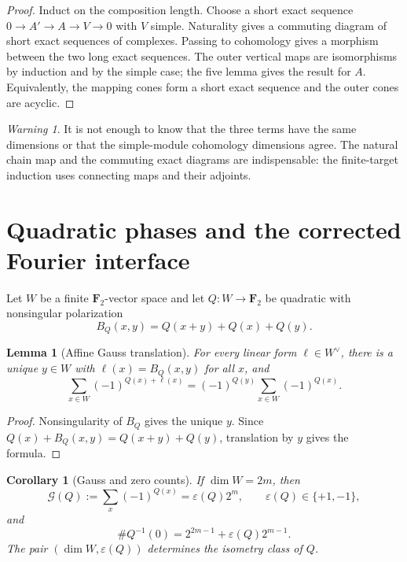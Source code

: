 \documentclass[11pt,reqno]{amsart}
\newtheorem{lemma}[theorem]{Lemma}
\newtheorem{corollary}[theorem]{Corollary}
\theoremstyle{remark}
\newtheorem{warning}[theorem]{Warning}
\numberwithin{equation}{section}
\newcommand{\F}{\mathbf F}
\newcommand{\Gsum}{\mathcal G}
\newcommand{\eps}{\varepsilon}
\begin{document}
\begin{proof}
Induct on the composition length.  Choose a short exact sequence
\(0\to A'\to A\to V\to0\) with \(V\) simple.  Naturality gives a
commuting diagram of short exact sequences of complexes.  Passing to
cohomology gives a morphism between the two long exact sequences.  The
outer vertical maps are isomorphisms by induction and by the simple case;
the five lemma gives the result for \(A\).  Equivalently, the mapping
cones form a short exact sequence and the outer cones are acyclic.
\end{proof}

\begin{warning}
It is not enough to know that the three terms have the same dimensions or
that the simple-module cohomology dimensions agree.  The natural chain map
and the commuting exact diagrams are indispensable: the finite-target
induction uses connecting maps and their adjoints.
\end{warning}

\section{Quadratic phases and the corrected Fourier interface}
\label{sec:fourier}

Let \(W\) be a finite \(\F_2\)-vector space and let
\(Q:W\to\F_2\) be quadratic with nonsingular polarization
\[
 B_Q(x,y)=Q(x+y)+Q(x)+Q(y).
\]

\begin{lemma}[Affine Gauss translation]\label{lem:gauss-translate}
For every linear form \(\ell\in W^\vee\), there is a unique
\(y\in W\) with \(\ell(x)=B_Q(x,y)\) for all \(x\), and
\[
 \sum_{x\in W}(-1)^{Q(x)+\ell(x)}
 =(-1)^{Q(y)}\sum_{x\in W}(-1)^{Q(x)}.
\]
\end{lemma}

\begin{proof}
Nonsingularity of \(B_Q\) gives the unique \(y\).  Since
\(Q(x)+B_Q(x,y)=Q(x+y)+Q(y)\), translation by \(y\) gives the formula.
\end{proof}

\begin{corollary}[Gauss and zero counts]\label{cor:gauss-count}
If \(\dim W=2m\), then
\[
 \Gsum(Q):=\sum_x(-1)^{Q(x)}=\eps(Q)2^m,
 \qquad \eps(Q)\in\{+1,-1\},
\]
and
\[
 \#Q^{-1}(0)=2^{2m-1}+\eps(Q)2^{m-1}.
\]
The pair \((\dim W,\eps(Q))\) determines the isometry class of \(Q\).
\end{corollary}
\end{document}
